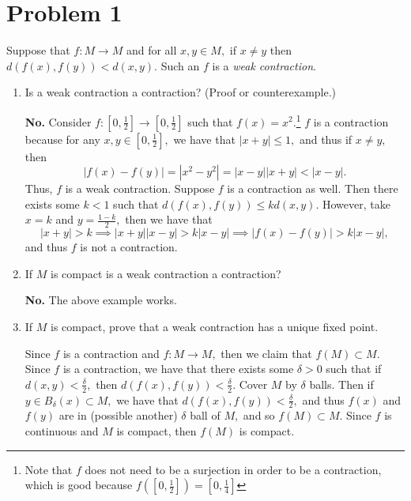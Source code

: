 \documentclass[11pt]{article}
\begin{document}
	
	
	\psetheader
\section*{Problem 1}
\begin{problem}
    Suppose that $f: M \to M$ and for all $x,y \in M,$ if $x \neq y$ then $d(f(x), f(y))< d(x,y).$ Such an $f$ is a \textit{weak contraction}.
\end{problem}
\begin{enumerate}
    \item 
    \begin{problem}
        Is a weak contraction a contraction? (Proof or counterexample.)
    \end{problem}
    \begin{solution}
        \textbf{No.} Consider $f: [0,\frac{1}{2}]\to [0, \frac{1}{2}]$ such that $f(x) = x^2.$\footnote{Note that $f$ does not need to be a surjection in order to be a contraction, which is good because $f([0, \frac{1}{2}]) = [0, \frac{1}{4}]$} $f$ is a contraction because for any $x,y \in [0,\frac{1}{2}],$ we have that $|x+y|\leq 1,$ and thus if $x\neq y,$ then
        \[|f(x) - f(y)| = |x^2 - y^2| = |x-y| |x+y|< |x-y|.\] Thus, $f$ is a weak contraction. Suppose $f$ is a contraction as well. Then there exists some $k<1$ such that $d(f(x), f(y)) \leq kd(x,y).$ However, take $x = k$ and $y = \frac{1-k}{2},$ then we have that 
        \[|x+y| > k \implies |x+y||x-y|>k|x-y| \implies |f(x) - f(y)|> k|x-y|,\] and thus $f$ is not a contraction.
    \end{solution}
    \item 
    \begin{problem}
        If $M$ is compact is a weak contraction a contraction?
    \end{problem}
    \begin{solution}
        \textbf{No.} The above example works.
    \end{solution}
    \item 
    \begin{problem}
        If $M$ is compact, prove that a weak contraction has a unique fixed point.
    \end{problem}
    \begin{solution}
        Since $f$ is a contraction and $f: M \to M,$ then we claim that $f(M)\subset M.$ Since $f$ is a contraction, we have that there exists some $\delta>0$ such that if $d(x,y)< \frac{\delta}{2},$ then $d(f(x), f(y))< \frac{\delta}{2}.$ Cover $M$ by $\delta$ balls. Then if $y \in B_\delta(x)\subset M,$ we have that $d(f(x), f(y))< \frac{\delta}{2},$ and thus $f(x)$ and $f(y)$ are in (possible another) $\delta$ ball of $M,$ and so $f(M)\subset M.$ Since $f$ is continuous and $M$ is compact, then $f(M)$ is compact.

\end{solution}
\end{enumerate}
\end{document}

